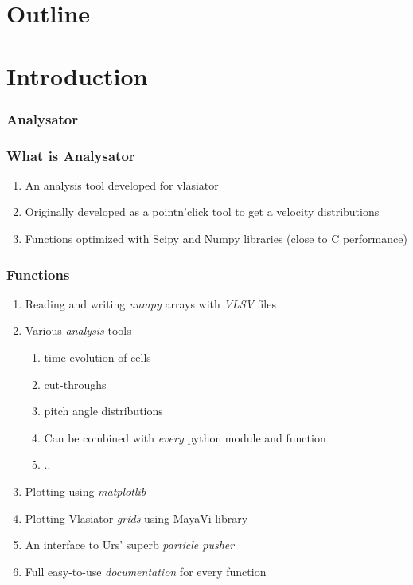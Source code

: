 \documentclass{beamer}
\begin{document}
\section*{Outline}
\begin{frame}
 \tableofcontents
\end{frame}

\section{Introduction}
\begin{frame}
 \frametitle{Analysator}
\end{frame}

\begin{frame}
 \frametitle{What is Analysator}
 \begin{enumerate}
  \item An analysis tool developed for vlasiator
  \item Originally developed as a pointn'click tool to get a velocity distributions
  \item Functions optimized with Scipy and Numpy libraries (close to C performance)
 \end{enumerate}
\end{frame}

\begin{frame}
 \frametitle{Functions}
 \begin{enumerate}
  \item Reading and writing \emph{numpy} arrays with \emph{VLSV} files
  \item Various \emph{analysis} tools
  \begin{enumerate}
   \item time-evolution of cells
   \item cut-throughs
   \item pitch angle distributions
   \item Can be combined with \emph{every} python module and function
   \item ..
  \end{enumerate}
  \item Plotting using \emph{matplotlib}
  \item Plotting Vlasiator \emph{grids} using MayaVi library
  \item An interface to Urs' superb \emph{particle pusher}
  \item Full easy-to-use \emph{documentation} for every function
 \end{enumerate}
\end{frame}
\end{document}
